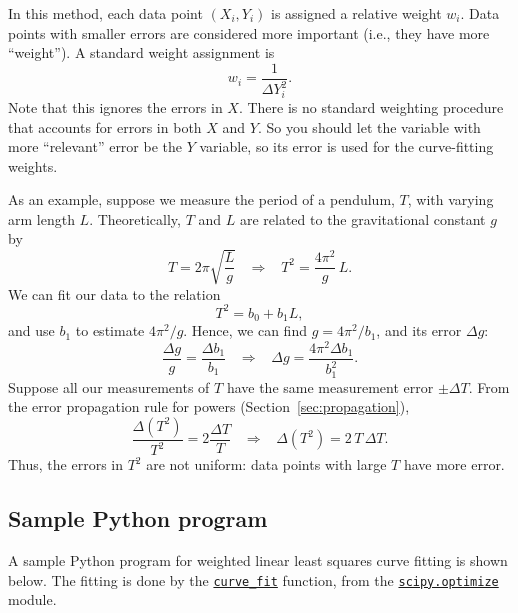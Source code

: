 \documentclass[11pt,a4paper]{article}
\begin{document}
In this method, each data point $(X_i,Y_i)$ is assigned a relative
weight $w_i$.  Data points with smaller errors are considered more
important (i.e., they have more ``weight'').  A standard weight
assignment is
\begin{equation*}
  w_i = \frac{1}{\Delta Y_i^{2}}.
  \label{weighting}
\end{equation*}
Note that this ignores the errors in $X$.  There is no standard
weighting procedure that accounts for errors in both $X$ and $Y$.  So
you should let the variable with more ``relevant'' error be the $Y$
variable, so its error is used for the curve-fitting weights.

As an example, suppose we measure the period of a pendulum, $T$, with
varying arm length $L$.  Theoretically, $T$ and $L$ are related to the
gravitational constant $g$ by
\begin{equation*}
  T = 2\pi \sqrt{\frac{L}{g}} \;\;\; \Rightarrow \;\;\; T^2 = \frac{4\pi^2}{g} \, L.
\end{equation*}
We can fit our data to the relation
\begin{equation*}
  T^2 = b_0 + b_1 L,
\end{equation*}
and use $b_1$ to estimate $4\pi^2/g$.  Hence, we can find $g =
4\pi^2/b_1$, and its error $\Delta g$:
\begin{equation*}
  \frac{\Delta g}{g} = \frac{\Delta b_1}{b_1} \;\;\;\Rightarrow\;\;\;
  \Delta g = \frac{4\pi^2\Delta b_1}{b_1^2}.
\end{equation*}
Suppose all our measurements of $T$ have the same measurement error
$\pm \Delta T$.  From the error propagation rule for powers
(Section~\ref{sec:propagation}),
\begin{equation*}
  \frac{\Delta (T^2)}{T^2} = 2 \frac{\Delta T}{T} \;\;\;\Rightarrow
  \;\;\; \Delta (T^2) = 2\,T\,\Delta T.
\end{equation*}
Thus, the errors in $T^2$ are not uniform: data points with large $T$
have more error.

\subsection{Sample Python program}

A sample Python program for weighted linear least squares curve
fitting is shown below.  The fitting is done by the
\href{https://docs.scipy.org/doc/scipy/reference/generated/scipy.optimize.curve_fit.html}{\texttt{curve\_fit}}
function, from the
\href{https://docs.scipy.org/doc/scipy/reference/optimize.html}{\texttt{scipy.optimize}}
module.
\end{document}
